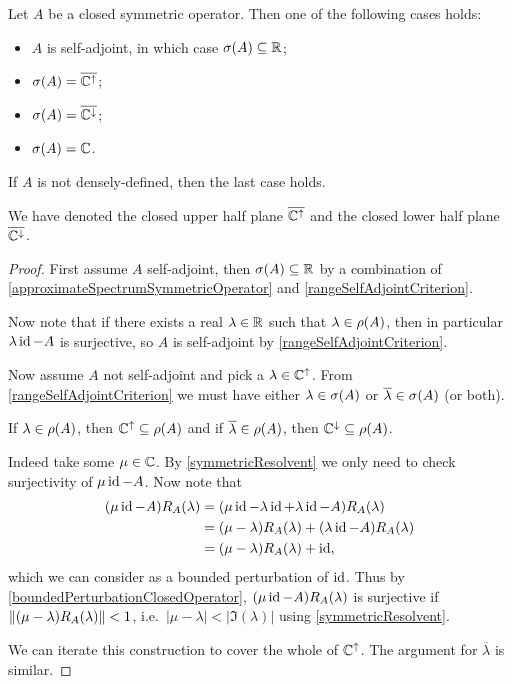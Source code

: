 \begin{proposition}
Let $A$ be a closed symmetric operator. Then one of the following cases holds:
\begin{itemize}
\item $A$ is self-adjoint, in which case $\sigma(A) \subseteq \mathbb{R}$;
\item $\sigma(A) = \overline{\mathbb{C}^{\uparrow}}$;
\item $\sigma(A) = \overline{\mathbb{C}^{\downarrow}}$;
\item $\sigma(A) = \mathbb{C}$.
\end{itemize}
If $A$ is not densely-defined, then the last case holds.
\end{proposition}
We have denoted the closed upper half plane $\overline{\mathbb{C}^{\uparrow}}$ and the closed lower half plane $\overline{\mathbb{C}^{\downarrow}}$.
\begin{proof}
First assume $A$ self-adjoint, then $\sigma(A)\subseteq \mathbb{R}$ by a combination of \ref{approximateSpectrumSymmetricOperator} and \ref{rangeSelfAdjointCriterion}.

Now note that if there exists a real $\lambda\in\mathbb{R}$ such that $\lambda \in \rho(A)$, then in particular $\lambda\operatorname{id} -A$ is surjective, so $A$ is self-adjoint by \ref{rangeSelfAdjointCriterion}.

Now assume $A$ not self-adjoint and pick a $\lambda\in \mathbb{C}^{\uparrow}$. From \ref{rangeSelfAdjointCriterion} we must have either $\lambda\in\sigma(A)$ or $\overline{\lambda}\in\sigma(A)$ (or both).

If $\lambda\in \rho(A)$, then $\mathbb{C}^\uparrow \subseteq \rho(A)$ and if $\overline{\lambda}\in\rho(A)$, then $\mathbb{C}^\downarrow \subseteq \rho(A)$.

Indeed take some $\mu\in\mathbb{C}$.
By \ref{symmetricResolvent} we only need to check surjectivity of $\mu\operatorname{id} - A$. Now note that
\begin{align*}
(\mu\operatorname{id} - A)R_A(\lambda) &= (\mu\operatorname{id} -\lambda\operatorname{id}+\lambda\operatorname{id} - A)R_A(\lambda) \\
&= (\mu-\lambda)R_A(\lambda) + (\lambda\operatorname{id}-A)R_A(\lambda) \\
&= (\mu-\lambda)R_A(\lambda) + \operatorname{id},
\end{align*}
which we can consider as a bounded perturbation of $\operatorname{id}$. Thus by \ref{boundedPerturbationClosedOperator}, $(\mu\operatorname{id} - A)R_A(\lambda)$ is surjective if $\lVert(\mu-\lambda)R_A(\lambda)\rVert< 1$, i.e.\ $|\mu-\lambda| < |\Im(\lambda)|$ using \ref{symmetricResolvent}.

We can iterate this construction to cover the whole of $\mathbb{C}^\uparrow$. The argument for $\overline{\lambda}$ is similar.
\end{proof}

